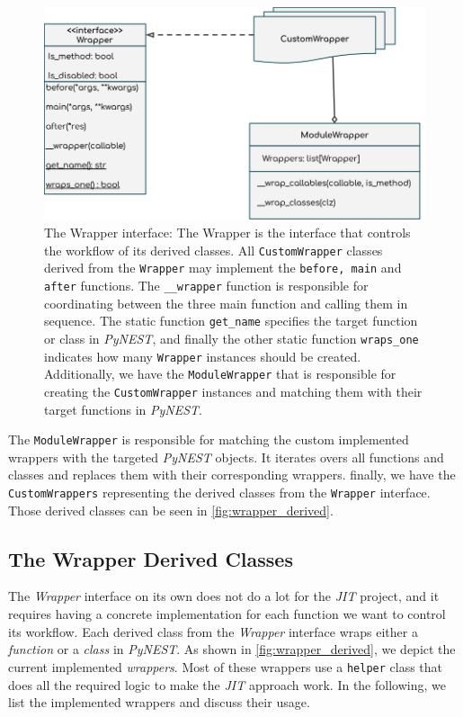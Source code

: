 \begin{figure}[ht!]
\centering
\includegraphics[width=\textwidth,height=\textheight,keepaspectratio]{src/pic/wrapper_uml.png}
\caption{The Wrapper interface: The Wrapper is the interface that controls the workflow of its derived classes. All \texttt{CustomWrapper} classes derived from the \texttt{Wrapper} may implement the \texttt{before, main} and \texttt{after} functions. The \texttt{\_\_wrapper} function is responsible for coordinating between the three main function and calling them in sequence. The static function \texttt{get\_name} specifies the target function or class in \emph{PyNEST}, and finally the other static function \texttt{wraps\_one} indicates how many \texttt{Wrapper} instances should be created. Additionally, we have the \texttt{ModuleWrapper} that is responsible for creating the \texttt{CustomWrapper} instances and matching them with their target functions in \emph{PyNEST}.}
\label{fig:wrapper_uml}
\end{figure}

The \texttt{ModuleWrapper} is responsible for matching the custom implemented wrappers with the targeted \emph{PyNEST} objects. It iterates overs all functions and classes and replaces them with their corresponding wrappers. finally, we have the \texttt{CustomWrappers} representing the derived classes from the \texttt{Wrapper} interface. Those derived classes can be seen in \autoref{fig:wrapper_derived}.

\subsection{The Wrapper Derived Classes}

The \emph{Wrapper} interface on its own does not do a lot for the \emph{JIT} project, and it requires having a concrete implementation for each function we want to control its workflow. Each derived class from the \emph{Wrapper} interface wraps either a \emph{function} or a \emph{class} in \emph{PyNEST}. As shown in \autoref{fig:wrapper_derived}, we depict the current implemented \emph{wrappers}. Most of these wrappers use a \texttt{helper} class that does all the required logic to make the \emph{JIT} approach work. In the following, we list the implemented wrappers and discuss their usage.

